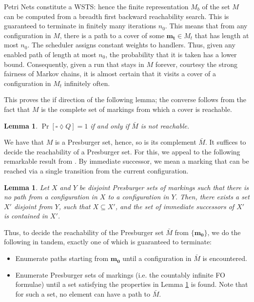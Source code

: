 \documentclass{article}
\newtheorem{lemma}[definition]{Lemma}
\theoremstyle{remark}
\begin{document}
Petri Nets constitute a WSTS: hence the finite representation $M_b$ of the set $M$ can be computed from a breadth first backward reachability search. This is guaranteed to terminate in finitely many iterations $n_0$. This means that from any configuration in $M$, there is a path to a cover of some $\mathbf{m_t} \in M_t$ that has length at most $n_0$. The scheduler assigns constant weights to handlers. Thus, given any enabled path of length at most $n_0$, the probability that it is taken has a lower bound. Consequently, given a run that stays in $M$ forever, courtesy the strong fairness of Markov chains, it is almost certain that it visits a cover of a configuration in $M_t$ infinitely often. 

This proves the if direction of the following lemma; the converse follows from the fact that $M$ is the complete set of markings from which a cover is reachable.

\begin{lemma}
\label{lem:special}
$\Pr[\square \lozenge Q] = 1$ if and only if $\bar{M}$ is not reachable. 
\end{lemma}

We have that $M$ is a Presburger set, hence, so is its complement $\bar{M}$. It suffices to decide the reachability of a Presburger set. For this, we appeal to the following remarkable result from \cite[Section 9]{vassreach2012}. By immediate successor, we mean a marking that can be reached via a single transition from the current configuration.

\begin{lemma}
\label{lem:magic}
Let $X$ and $Y$ be disjoint Presburger sets of markings such that there is no path from a configuration in $X$ to a configuration in $Y$. Then, there exists a set $X'$ disjoint from $Y$, such that $X \subseteq X'$, and the set of immediate successors of $X'$ is contained in $X'$.
\end{lemma}

Thus, to decide the reachability of the Presburger set $\bar{M}$ from $\{\mathbf{m_0}\}$, we do the following in tandem, exactly one of which is guaranteed to terminate:
\begin{itemize}
\item Enumerate paths starting from $\mathbf{m_0}$ until a configuration in $\bar{M}$ is encountered.
\item Enumerate Presburger sets of markings (i.e. the countably infinite FO formulae) until a set satisfying the properties in Lemma \ref{lem:magic} is found. Note that for such a set, no element can have a path to $\bar{M}$.
\end{itemize}
\end{document}
